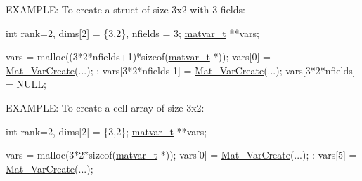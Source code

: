 E\-X\-A\-M\-P\-L\-E\-: To create a struct of size 3x2 with 3 fields\-: 
\begin{DoxyCode}
\textcolor{keywordtype}{int} rank=2, dims[2] = \{3,2\}, nfields = 3;
\hyperlink{structmatvar__t}{matvar\_t} **vars;

vars = malloc((3*2*nfields+1)*\textcolor{keyword}{sizeof}(\hyperlink{structmatvar__t}{matvar\_t} *));
vars[0]             = \hyperlink{group__MAT_ga1c54a84bb4d810c6fccdb8869489eac4}{Mat\_VarCreate}(...);
   :
vars[3*2*nfields-1] = \hyperlink{group__MAT_ga1c54a84bb4d810c6fccdb8869489eac4}{Mat\_VarCreate}(...);
vars[3*2*nfields]   = NULL;
\end{DoxyCode}


E\-X\-A\-M\-P\-L\-E\-: To create a cell array of size 3x2\-: 
\begin{DoxyCode}
\textcolor{keywordtype}{int} rank=2, dims[2] = \{3,2\};
\hyperlink{structmatvar__t}{matvar\_t} **vars;

vars = malloc(3*2*\textcolor{keyword}{sizeof}(\hyperlink{structmatvar__t}{matvar\_t} *));
vars[0]             = \hyperlink{group__MAT_ga1c54a84bb4d810c6fccdb8869489eac4}{Mat\_VarCreate}(...);
   :
vars[5] = \hyperlink{group__MAT_ga1c54a84bb4d810c6fccdb8869489eac4}{Mat\_VarCreate}(...);
\end{DoxyCode}



